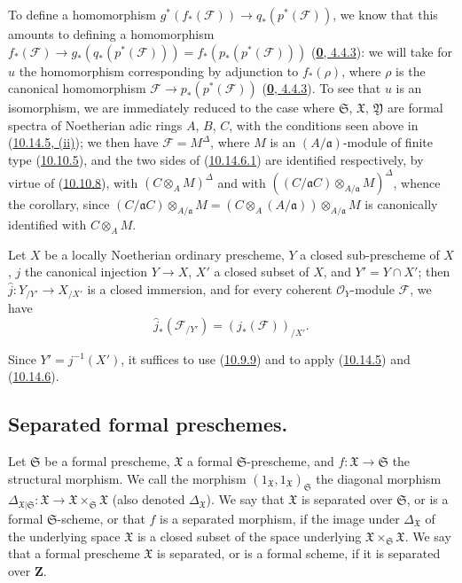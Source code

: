 To define a homomorphism
$g^*(f_*(\mathscr{F}))\to q_*(p^*(\mathscr{F}))$, we know that this amounts
to defining a homomorphism
$f_*(\mathscr{F})\to g_*(q_*(p^*(\mathscr{F})))
=f_*(p_*(p^*(\mathscr{F})))$
(\hyperref[0.4.4.3]{\textbf{0}, 4.4.3}): we will take for $u$ the homomorphism
corresponding by adjunction to $f_*(\rho)$, where $\rho$
is the canonical homomorphism
$\mathscr{F}\to p_*(p^*(\mathscr{F}))$
(\hyperref[0.4.4.3]{\textbf{0}, 4.4.3}). To see that $u$ is an isomorphism, we
are immediately reduced to the case where $\mathfrak{S}$, $\mathfrak{X}$,
$\mathfrak{Y}$ are formal spectra of Noetherian adic rings $A$,
$B$, $C$, with the conditions seen above in
(\hyperref[I.10.14.5]{10.14.5, (ii)}); we then have
$\mathscr{F}=M^\Delta$, where $M$ is an $(A/\mathfrak{a})$-module of finite
type (\hyperref[I.10.10.5]{10.10.5}), and the two sides of
(\hyperref[I.10.14.6.1]{10.14.6.1}) are identified respectively, by virtue
of (\hyperref[I.10.10.8]{10.10.8}), with
$(C\otimes_A M)^\Delta$ and with
$((C/\mathfrak{a}C)\otimes_{A/\mathfrak{a}}M)^\Delta$, whence the corollary,
since
$(C/\mathfrak{a}C)\otimes_{A/\mathfrak{a}}M
=(C\otimes_A(A/\mathfrak{a}))\otimes_{A/\mathfrak{a}}M$ is canonically
identified with $C\otimes_A M$.

\begin{corollary}[10.14.7]
\label{I.10.14.7}
Let $X$ be a locally Noetherian ordinary prescheme, $Y$ a closed
sub-prescheme of $X$, $j$ the canonical injection $Y\to X$, $X'$ a closed
subset of $X$, and $Y'=Y\cap X'$; then
$\widehat{j}:Y_{/Y'}\to X_{/X'}$ is a closed immersion, and for every
coherent $\mathscr{O}_Y$-module $\mathscr{F}$, we have
\[
  \widehat{j}_*(\mathscr{F}_{/Y'})=(j_*(\mathscr{F}))_{/X'}.
\]
\end{corollary}

Since $Y'=j^{-1}(X')$, it suffices to use
(\hyperref[I.10.9.9]{10.9.9}) and to apply
(\hyperref[I.10.14.5]{10.14.5}) and
(\hyperref[I.10.14.6]{10.14.6}).


\subsection{Separated formal preschemes.}
\label{subsection:I.10.15}

\begin{definition}[10.15.1]
\label{I.10.15.1}
Let $\mathfrak{S}$ be a formal prescheme, $\mathfrak{X}$ a formal
$\mathfrak{S}$-prescheme, and
$f:\mathfrak{X}\to\mathfrak{S}$ the structural morphism. We call the
morphism $(1_{\mathfrak{X}},1_{\mathfrak{X}})_{\mathfrak{S}}$ the
diagonal morphism
$\Delta_{\mathfrak{X}|\mathfrak{S}}:\mathfrak{X}\to
\mathfrak{X}\times_{\mathfrak{S}}\mathfrak{X}$ (also denoted
$\Delta_{\mathfrak{X}}$). We say that
$\mathfrak{X}$ is separated over $\mathfrak{S}$, or is a formal
$\mathfrak{S}$-scheme, or that $f$ is a separated morphism, if the image
under $\Delta_{\mathfrak{X}}$ of the underlying space $\mathfrak{X}$ is a
closed subset of the space underlying
$\mathfrak{X}\times_{\mathfrak{S}}\mathfrak{X}$. We say that a formal
prescheme $\mathfrak{X}$ is separated, or is a formal scheme, if it is
separated over $\mathbf{Z}$.
\end{definition}

